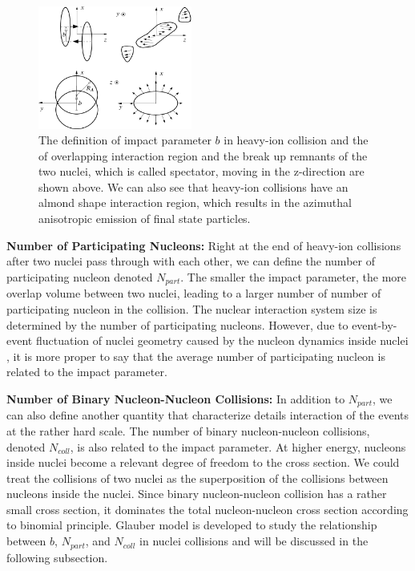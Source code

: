 \begin{figure}[hbtp]
\begin{center}
\includegraphics[width=0.45\textwidth]{Figures/Chapter1/IPHIColl.png}
\caption{The definition of impact parameter $b$ in heavy-ion collision and the of overlapping interaction region and the break up remnants of the two nuclei, which is called spectator, moving in the z-direction are shown above. We can also see that heavy-ion collisions have an almond shape interaction region, which results in the azimuthal anisotropic emission of final state particles.}
\label{IPHIColl}
\end{center}
\end{figure} 


\textbf{Number of Participating Nucleons:} Right at the end of heavy-ion collisions after two nuclei pass through with each other, we can define the number of participating nucleon denoted $N_{part}$. The smaller the impact parameter, the more overlap volume between two nuclei, leading to a larger number of number of participating nucleon in the collision. The nuclear interaction system size is determined by the number of participating nucleons. However, due to event-by-event fluctuation of nuclei geometry caused by the nucleon dynamics inside nuclei \cite{GuntherV3}, it is more proper to say that the average number of participating nucleon is related to the impact parameter.

\textbf{Number of Binary Nucleon-Nucleon Collisions:} In addition to $N_{part}$, we can also define another quantity that characterize details interaction of the events at the rather hard scale. The number of binary nucleon-nucleon collisions, denoted $N_{coll}$, is also related to the impact parameter. At higher energy, nucleons inside nuclei become a relevant degree of freedom to the cross section. We could treat the collisions of two nuclei as the superposition of the collisions between nucleons inside the nuclei. Since binary nucleon-nucleon collision has a rather small cross section, it dominates the total nucleon-nucleon cross section according to binomial principle. Glauber model is developed to study the relationship between $b$, $N_{part}$, and $N_{coll}$ in nuclei collisions and will be discussed in the following subsection.



